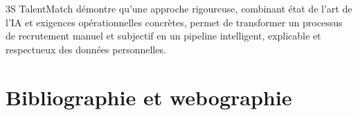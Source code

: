 \documentclass[12pt,a4paper]{report}
\begin{document}
\medskip

3S TalentMatch démontre qu'une approche rigoureuse, combinant état de l'art de l'IA et exigences opérationnelles concrètes, permet de transformer un processus de recrutement manuel et subjectif en un pipeline intelligent, explicable et respectueux des données personnelles.

\newpage

\chapter*{Bibliographie et webographie}
\end{document}
